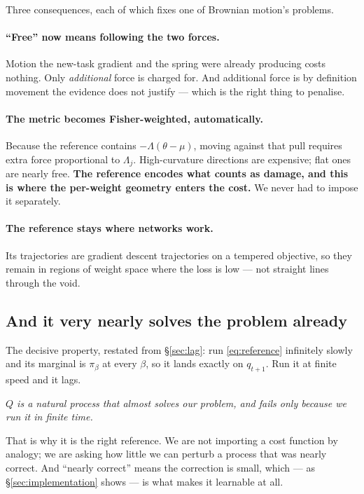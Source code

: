 \documentclass[11pt]{article}
\theoremstyle{definition}
\theoremstyle{plain}
\theoremstyle{remark}
\begin{document}
Three consequences, each of which fixes one of Brownian motion's problems.

\paragraph{``Free'' now means following the two forces.}
Motion the new-task gradient and the spring were already producing costs
nothing. Only \emph{additional} force is charged for. And additional force is by
definition movement the evidence does not justify --- which is the right thing
to penalise.

\paragraph{The metric becomes Fisher-weighted, automatically.}
Because the reference contains $-\Lambda(\theta-\mu)$, moving against that pull
requires extra force proportional to $\Lambda_j$. High-curvature directions are
expensive; flat ones are nearly free. \textbf{The reference encodes what counts
as damage, and this is where the per-weight geometry enters the cost.} We never
had to impose it separately.

\paragraph{The reference stays where networks work.}
Its trajectories are gradient descent trajectories on a tempered objective, so
they remain in regions of weight space where the loss is low --- not straight
lines through the void.

\subsection{And it very nearly solves the problem already}

The decisive property, restated from \S\ref{sec:lag}: run \eqref{eq:reference}
infinitely slowly and its marginal is $\pi_\beta$ at every $\beta$, so it lands
exactly on $q_{t+1}$. Run it at finite speed and it lags.

\begin{center}
\emph{$Q$ is a natural process that almost solves our problem, and fails only
because we run it in finite time.}
\end{center}

That is why it is the right reference. We are not importing a cost function by
analogy; we are asking how little we can perturb a process that was nearly
correct. And ``nearly correct'' means the correction is small, which
--- as \S\ref{sec:implementation} shows --- is what makes it learnable at all.
\end{document}
